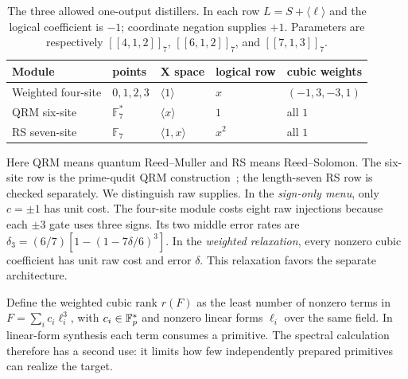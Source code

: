 \begin{table}[ht]
\centering\small
\begin{tabular}{lllll}
\toprule
Module & points & X space & logical row & cubic weights\\
\midrule
Weighted four-site & $0,1,2,3$ & $\langle1\rangle$ & $x$ & $(-1,3,-3,1)$\\
QRM six-site & $\mathbb F_7^*$ & $\langle x\rangle$ & $1$ & all $1$\\
RS seven-site & $\mathbb F_7$ & $\langle1,x\rangle$ & $x^2$ & all $1$\\
\bottomrule
\end{tabular}
\caption{The three allowed one-output distillers. In each row
$L=S+\langle\ell\rangle$ and the logical coefficient is $-1$;
coordinate negation supplies $+1$. Parameters are respectively
$[[4,1,2]]_7$, $[[6,1,2]]_7$, and $[[7,1,3]]_7$.}\label{tab:modules}
\end{table}
Here QRM means quantum Reed--Muller and RS means Reed--Solomon.
The six-site row is the prime-qudit QRM construction~\cite{cab,campbell2014};
the length-seven RS row is checked separately. We distinguish raw supplies.
In the \emph{sign-only menu}, only $c=\pm1$ has unit cost. The four-site
module costs eight raw injections because each $\pm3$ gate uses three signs.
Its two middle error rates are
$\delta_3=(6/7)[1-(1-7\delta/6)^3]$.
In the \emph{weighted relaxation}, every nonzero cubic coefficient has unit
raw cost and error $\delta$. This relaxation favors the separate architecture.

Define the weighted cubic rank $r(F)$ as the least number of nonzero terms in
$F=\sum_i c_i\ell_i^3$, with $c_i\in\mathbb F_p^*$ and nonzero linear forms $\ell_i$
over the same field. In linear-form synthesis each term consumes a primitive.
The spectral calculation therefore has a second use: it limits how few
independently prepared primitives can realize the target.


